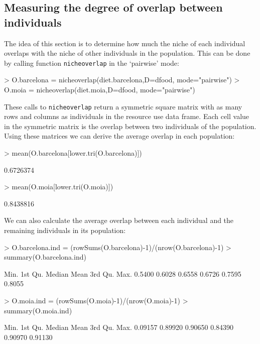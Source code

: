 \documentclass[11pt,a4paper]{article}
\begin{document}
\subsection{Measuring the degree of overlap between individuals}
The idea of this section is to determine how much the niche of each individual overlaps with the niche of other individuals in the population. This can be done by calling function \texttt{nicheoverlap} in the `pairwise' mode:
\begin{Schunk}
\begin{Sinput}
> O.barcelona = nicheoverlap(diet.barcelona,D=dfood, mode="pairwise")
> O.moia = nicheoverlap(diet.moia,D=dfood, mode="pairwise")
\end{Sinput}
\end{Schunk}
These calls to \texttt{nicheoverlap} return a symmetric square matrix with as many rows and columns as individuals in the resource use data frame. Each cell value in the symmetric matrix is the overlap between two individuals of the population. Using these matrices we can derive the average overlap in each population:
\begin{Schunk}
\begin{Sinput}
> mean(O.barcelona[lower.tri(O.barcelona)])
\end{Sinput}
\begin{Soutput}
[1] 0.6726374
\end{Soutput}
\begin{Sinput}
> mean(O.moia[lower.tri(O.moia)])
\end{Sinput}
\begin{Soutput}
[1] 0.8438816
\end{Soutput}
\end{Schunk}
We can also calculate the average overlap between each individual and the remaining individuals in its population:
\begin{Schunk}
\begin{Sinput}
> O.barcelona.ind = (rowSums(O.barcelona)-1)/(nrow(O.barcelona)-1)
> summary(O.barcelona.ind)
\end{Sinput}
\begin{Soutput}
   Min. 1st Qu.  Median    Mean 3rd Qu.    Max. 
 0.5400  0.6028  0.6558  0.6726  0.7595  0.8055 
\end{Soutput}
\begin{Sinput}
> O.moia.ind = (rowSums(O.moia)-1)/(nrow(O.moia)-1)
> summary(O.moia.ind)
\end{Sinput}
\begin{Soutput}
   Min. 1st Qu.  Median    Mean 3rd Qu.    Max. 
0.09157 0.89920 0.90650 0.84390 0.90970 0.91130 
\end{Soutput}
\end{Schunk}
\end{document}
